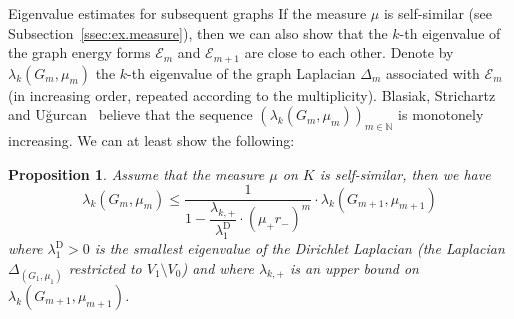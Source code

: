 \documentclass[12pt,reqno,a4paper]{amsart}            %
\makeatletter
\numberwithin{equation}{section}
\newcommand{\myfont}{\sffamily}
\theoremstyle{mythmstyle}       %
\newtheorem{proposition}[theorem]{Proposition}
\theoremstyle{mydefstyle}        %
\renewcommand\subsection{\@startsection{subsection}{2}%
  \z@{-.5\linespacing\@plus-.7\linespacing}{.5\linespacing}%
  {\large\myfont\bfseries}}
\newcommand{\Subsec}[1]{Subsection~\ref{ssec:#1}}
\renewcommand{\rho}{\varrho}   %
\newcommand{\N}{\mathbb{N}} %
\newcommand{\1}{\mathbbm 1}                    %
\newcommand{\Dir}{{\mathrm D}}              %
\newcommand{\energy}{\mathcal E}
\makeatother
\begin{document}


\subsection{Eigenvalue estimates for subsequent graphs}
\label{ssec:ev.graphs}
If the measure $\mu$ is self-similar (see \Subsec{ex.measure}), then
we can also show that the $k$-th eigenvalue of the graph energy forms
$\energy_m$ and $\energy_{m+1}$ are close to each other.  Denote by
$\lambda_k(G_m,\mu_m)$ the $k$-th eigenvalue of the graph Laplacian
$\Delta_m$ associated with $\energy_m$ (in increasing order, repeated
according to the multiplicity).  Blasiak, Strichartz and U{\u
  g}urcan~\cite[text after eq.~(2.9)]{bsu:08} believe that the
sequence $(\lambda_k(G_m,\mu_m))_{m \in \N}$ is monotonely increasing.
We can at least show the following:
\begin{proposition}
  \label{prp:ew.subseq}
  Assume that the measure $\mu$ on $K$ is self-similar, then we have
  \begin{equation*}
    \lambda_k(G_m,\mu_m)
    \le
    \frac 1{1-\dfrac{\lambda_{k,+}}{\lambda_1^\Dir}\cdot (\mu_+r_-)^m}
    \cdot \lambda_k(G_{m+1},\mu_{m+1})
  \end{equation*}
  where $\lambda_1^\Dir>0$ is the smallest eigenvalue of the Dirichlet
  Laplacian (the Laplacian $\Delta_{(G_1,\mu_1)}$ restricted to $V_1\setminus
  V_0$) and where $\lambda_{k,+}$ is an upper bound on
  $\lambda_k(G_{m+1},\mu_{m+1})$.
\end{proposition}
\end{document}
